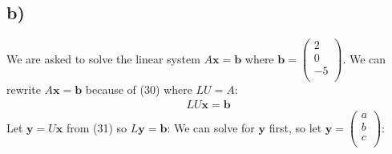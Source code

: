 \documentclass[12pt]{article}
\begin{document}
\subsection{b)}
We are asked to solve the linear system $A\textbf{x} =\textbf{b}$
where $\textbf{b} = 
\left(\begin{array}{c}
2\\
0\\
-5\\
\end{array}\right)$.
We can rewrite $A\textbf{x} =\textbf{b}$ because of (30) where $LU=A$:
\begin{align}
LU\textbf{x} =\textbf{b}
\end{align}
Let $\textbf{y}=U\textbf{x}$ from (31) so $L\textbf{y}=\textbf{b}$:
We can solve for $\textbf{y}$ first, so let $\textbf{y} = 
\left(\begin{array}{c}
a\\
b\\
c\\
\end{array}\right)$:
\end{document}
